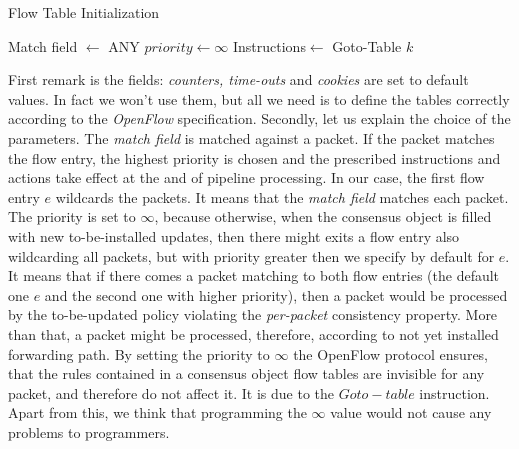 \documentclass{article}
\theoremstyle{remark}
\begin{document}
\begin{algorithm}
  \caption{Flow Table Initialization}\label{FTInit}
  \begin{algorithmic}[1]
        \State Match field $\gets$ ANY
        \State $priority\gets\infty$
        \State Instructions$\gets$ Goto-Table $k$
      \EndFor
  \end{algorithmic}
\end{algorithm}
First remark is the fields: \emph{counters, time-outs} and \emph{cookies} are set to default values. In fact we won't use them, but all we need is to define the tables correctly according to the \emph{OpenFlow} specification. Secondly, let us explain the choice of the parameters. The \emph{match field} is matched against a packet. If the packet matches the flow entry, the highest priority is chosen and the prescribed instructions and actions take effect at the and of pipeline processing. In our case, the first flow entry $e$ wildcards the packets. It means that the \emph{match field} matches each packet. The priority is set to $\infty$, because otherwise, when the consensus object is filled with new to-be-installed updates, then there might exits a flow entry also wildcarding all packets, but with priority greater then we specify by default for $e$. It means that if there comes a packet matching to both flow entries (the default one $e$ and the second one with higher priority), then a packet would be processed by the to-be-updated policy violating the \emph{per-packet} consistency property. More than that, a packet might be processed, therefore, according to not yet installed forwarding path.
By setting the priority to $\infty$ the OpenFlow protocol ensures, that the rules contained in a consensus object flow tables are invisible for any packet, and therefore do not affect it. It is due to the $Goto-table$ instruction.
Apart from this, we think that programming the $\infty$ value would not cause any problems to programmers. 
\end{document}
